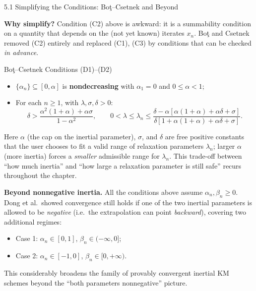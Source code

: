 \documentclass[aspectratio=169,10pt]{beamer}
\begin{document}
\begin{frame}[allowframebreaks]{5.1 Simplifying the Conditions: Bo\c{t}--Csetnek and Beyond}

  \textbf{Why simplify?}  Condition (C2) above is awkward: it is a
  summability condition on a quantity that depends on the (not yet
  known) iterates $x_n$.  Bo\c{t} and Csetnek removed (C2) entirely
  and replaced (C1), (C3) by conditions that can be checked
  \emph{in advance}.

  \begin{block}{Bo\c{t}--Csetnek Conditions (D1)--(D2)}
    \begin{itemize}
      \item[(D1)] $\{\alpha_n\}\subseteq[0,\alpha]$ is
            \textbf{nondecreasing} with $\alpha_1=0$ and
            $0\le\alpha<1$;
      \item[(D2)] For each $n\ge1$, with $\lambda,\sigma,\delta>0$:
      \[
        \delta > \frac{\alpha^2(1+\alpha)+\alpha\sigma}{1-\alpha^2},
        \qquad
        0<\lambda\le\lambda_n\le
        \frac{\delta-\alpha[\alpha(1+\alpha)+\alpha\delta+\sigma]}
             {\delta[1+\alpha(1+\alpha)+\alpha\delta+\sigma]}.
      \]
    \end{itemize}
  \end{block}

  Here $\alpha$ (the cap on the inertial parameter), $\sigma$, and
  $\delta$ are free positive constants that the user chooses to
  fit a valid range of relaxation parameters $\lambda_n$; larger
  $\alpha$ (more inertia) forces a \emph{smaller} admissible range
  for $\lambda_n$.  This trade-off between ``how much inertia'' and
  ``how large a relaxation parameter is still safe'' recurs
  throughout the chapter.

  \framebreak

  \textbf{Beyond nonnegative inertia.}  All the conditions above
  assume $\alpha_n,\beta_n\ge0$.  Dong et al.\ showed convergence
  still holds if one of the two inertial parameters is allowed to
  be \emph{negative} (i.e.\ the extrapolation can point
  \emph{backward}), covering two additional regimes:
  \begin{itemize}
    \item Case 1: $\alpha_n\in[0,1]$, $\beta_n\in(-\infty,0]$;
    \item Case 2: $\alpha_n\in[-1,0]$, $\beta_n\in[0,+\infty)$.
  \end{itemize}
  This considerably broadens the family of provably convergent
  inertial KM schemes beyond the ``both parameters nonnegative''
  picture.

\end{frame}
\end{document}
